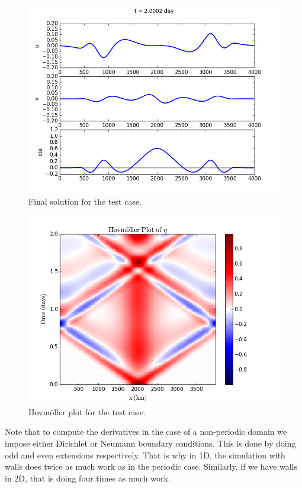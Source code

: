 \documentclass[11pt]{article}
\begin{document}
\begin{figure}[h]
\begin{center}
\includegraphics[width=12cm]{Figures/ex1_fig1.png}
\caption{Final solution for the test case.}
\end{center}
\end{figure}

\begin{figure}[h]
\begin{center}
\includegraphics[width=12cm]{Figures/ex1_fig2.png}
\caption{Hovm\"oller plot for the test case.}
\end{center}
\end{figure}

Note that to compute the derivatives in the case of a non-periodic domain we impose either Dirichlet or Neumann boundary conditions.  This is done by doing odd and even extensions respectively.  That is why in 1D, the simulation with walls does twice as much work as in the periodic case.  Similarly, if we have walls in 2D, that is doing four times as much work.
\end{document}
